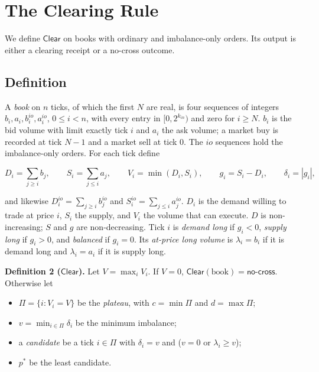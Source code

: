 
\section{The Clearing Rule}

We define \(\mathsf{Clear}\) on books with ordinary and imbalance-only orders. Its output is either a clearing receipt or a no-cross outcome.

\subsection{Definition}

A \emph{book} on \(n\) ticks, of which the first \(N\) are real, is four sequences of integers \(b_i, a_i, b^{io}_i, a^{io}_i\), \(0 \le i < n\), with every entry in \([0, 2^{k_{in}})\) and zero for \(i \ge N\). \(b_i\) is the bid volume with limit exactly tick \(i\) and \(a_i\) the ask volume; a market buy is recorded at tick \(N-1\) and a market sell at tick 0. The \(io\) sequences hold the imbalance-only orders. For each tick define

\[D_i = \sum_{j \ge i} b_j, \qquad S_i = \sum_{j \le i} a_j, \qquad V_i = \min(D_i, S_i), \qquad g_i = S_i - D_i, \qquad \delta_i = |g_i|,\]

and likewise \(D^{io}_i = \sum_{j \ge i} b^{io}_j\) and \(S^{io}_i = \sum_{j \le i} a^{io}_j\). \(D_i\) is the demand willing to trade at price \(i\), \(S_i\) the supply, and \(V_i\) the volume that can execute. \(D\) is non-increasing; \(S\) and \(g\) are non-decreasing. Tick \(i\) is \emph{demand long} if \(g_i < 0\), \emph{supply long} if \(g_i > 0\), and \emph{balanced} if \(g_i = 0\). Its \emph{at-price long volume} is \(\lambda_i = b_i\) if it is demand long and \(\lambda_i = a_i\) if it is supply long.

\textbf{Definition 2 (\(\mathsf{Clear}\)).} Let \(V = \max_i V_i\). If \(V = 0\), \(\mathsf{Clear}(\text{book}) = \textsf{no-cross}\). Otherwise let

\begin{itemize}
\item
  \(\Pi = \{i : V_i = V\}\) be the \emph{plateau}, with \(c = \min \Pi\) and \(d = \max \Pi\);
\item
  \(v = \min_{i \in \Pi} \delta_i\) be the minimum imbalance;
\item
  a \emph{candidate} be a tick \(i \in \Pi\) with \(\delta_i = v\) and (\(v = 0\) or \(\lambda_i \ge v\));
\item
  \(p^*\) be the least candidate.
\end{itemize}

